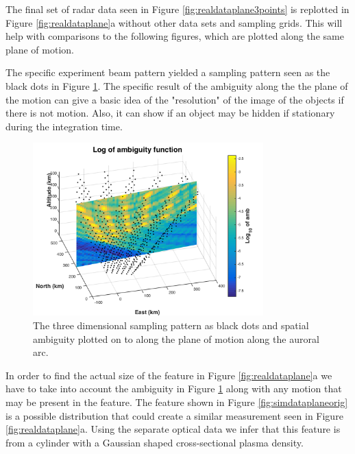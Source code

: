 The final set of radar data seen in Figure \ref{fig:realdataplane3points} is replotted in Figure \ref{fig:realdataplane}a without other data sets and sampling grids. This will help with comparisons to the following figures, which are plotted along the same plane of motion.


The specific experiment beam pattern yielded a sampling pattern seen as the black dots in Figure \ref{fig:rambplane}. The specific result of the ambiguity along the the plane of the motion can give a basic idea of the "resolution" of the image of the objects if there is not motion. Also, it can show if an object may be hidden if stationary during the integration time.

\begin{figure}[h!]
	\centering
	\includegraphics[width=3.5in]{ambplane}
	\caption{The three dimensional sampling pattern as black dots and spatial ambiguity plotted on to along the plane of motion along the auroral arc.}
	\label{fig:rambplane}
\end{figure}

In order to find the actual size of the feature in Figure \ref{fig:realdataplane}a we have to take into account the ambiguity in Figure \ref{fig:rambplane}  along with any motion that may be present in the feature. The feature shown in Figure \ref{fig:simdataplaneorig} is a possible distribution that could create a similar measurement seen in Figure  \ref{fig:realdataplane}a. Using the separate optical data we infer that this feature is from a cylinder with a Gaussian shaped cross-sectional plasma density. 

